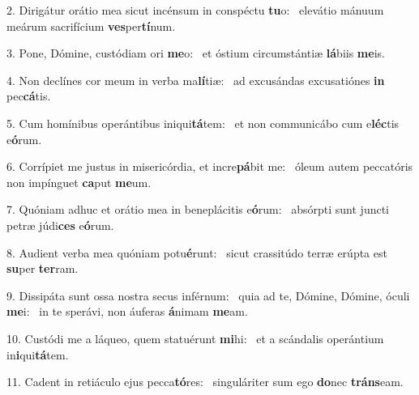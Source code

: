 2. Dirigátur orátio mea sicut incénsum in conspéctu \textbf{tu}o: \ast\  elevátio mánuum meárum sacrifícium \textbf{ves}per\textbf{tí}num.\

3. Pone, Dómine, custódiam ori \textbf{me}o: \ast\  et óstium circumstántiæ \textbf{lá}biis \textbf{me}is.\

4. Non declínes cor meum in verba ma\textbf{lí}tiæ: \ast\  ad excusándas excusatiónes \textbf{in} pec\textbf{cá}tis.\

5. Cum homínibus operántibus iniqui\textbf{tá}tem: \ast\  et non communicábo cum e\textbf{léc}tis e\textbf{ó}rum.\

6. Corrípiet me justus in misericórdia, et incre\textbf{pá}bit me: \ast\  óleum autem peccatóris non impínguet \textbf{ca}put \textbf{me}um.\

7. Quóniam adhuc et orátio mea in beneplácitis e\textbf{ó}rum: \ast\  absórpti sunt juncti petræ júdi\textbf{ces} e\textbf{ó}rum.\

8. Audient verba mea quóniam potu\textbf{é}runt: \ast\  sicut crassitúdo terræ erúpta est \textbf{su}per \textbf{ter}ram.\

9. Dissipáta sunt ossa nostra secus inférnum: \dag\  quia ad te, Dómine, Dómine, óculi \textbf{me}i: \ast\  in te sperávi, non áuferas \textbf{á}nimam \textbf{me}am.\

10. Custódi me a láqueo, quem statuérunt \textbf{mi}hi: \ast\  et a scándalis operántium in\textbf{i}qui\textbf{tá}tem.\

11. Cadent in retiáculo ejus pecca\textbf{tó}res: \ast\  singuláriter sum ego \textbf{do}nec \textbf{tráns}eam.\

